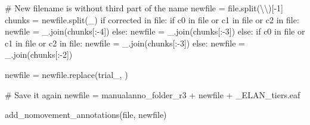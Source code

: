 \documentclass[
  letterpaper,
  DIV=11,
  numbers=noendperiod]{scrreprt}
\newenvironment{Shaded}{\begin{snugshade}}{\end{snugshade}}
\newcommand{\BuiltInTok}[1]{\textcolor[rgb]{0.00,0.23,0.31}{#1}}
\newcommand{\CharTok}[1]{\textcolor[rgb]{0.13,0.47,0.30}{#1}}
\newcommand{\CommentTok}[1]{\textcolor[rgb]{0.37,0.37,0.37}{#1}}
\newcommand{\ControlFlowTok}[1]{\textcolor[rgb]{0.00,0.23,0.31}{#1}}
\newcommand{\DecValTok}[1]{\textcolor[rgb]{0.68,0.00,0.00}{#1}}
\newcommand{\KeywordTok}[1]{\textcolor[rgb]{0.00,0.23,0.31}{#1}}
\newcommand{\NormalTok}[1]{\textcolor[rgb]{0.00,0.23,0.31}{#1}}
\newcommand{\OperatorTok}[1]{\textcolor[rgb]{0.37,0.37,0.37}{#1}}
\newcommand{\StringTok}[1]{\textcolor[rgb]{0.13,0.47,0.30}{#1}}
\begin{document}
\begin{Shaded}
\begin{Highlighting}[]
    \CommentTok{\# New filename is without third part of the name}
\NormalTok{    newfile }\OperatorTok{=} \BuiltInTok{file}\NormalTok{.split(}\StringTok{\textquotesingle{}}\CharTok{\textbackslash{}\textbackslash{}}\StringTok{\textquotesingle{}}\NormalTok{)[}\OperatorTok{{-}}\DecValTok{1}\NormalTok{]}
\NormalTok{    chunks }\OperatorTok{=}\NormalTok{ newfile.split(}\StringTok{\textquotesingle{}\_\textquotesingle{}}\NormalTok{)}
    \ControlFlowTok{if} \StringTok{\textquotesingle{}corrected\textquotesingle{}} \KeywordTok{in} \BuiltInTok{file}\NormalTok{:}
        \ControlFlowTok{if} \StringTok{\textquotesingle{}c0\textquotesingle{}} \KeywordTok{in} \BuiltInTok{file} \KeywordTok{or} \StringTok{\textquotesingle{}c1\textquotesingle{}} \KeywordTok{in} \BuiltInTok{file} \KeywordTok{or} \StringTok{\textquotesingle{}c2\textquotesingle{}} \KeywordTok{in} \BuiltInTok{file}\NormalTok{:}
\NormalTok{            newfile }\OperatorTok{=} \StringTok{\textquotesingle{}\_\textquotesingle{}}\NormalTok{.join(chunks[:}\OperatorTok{{-}}\DecValTok{4}\NormalTok{])}
        \ControlFlowTok{else}\NormalTok{:}
\NormalTok{            newfile }\OperatorTok{=} \StringTok{\textquotesingle{}\_\textquotesingle{}}\NormalTok{.join(chunks[:}\OperatorTok{{-}}\DecValTok{3}\NormalTok{])}
    \ControlFlowTok{else}\NormalTok{:}
        \ControlFlowTok{if} \StringTok{\textquotesingle{}c0\textquotesingle{}} \KeywordTok{in} \BuiltInTok{file} \KeywordTok{or} \StringTok{\textquotesingle{}c1\textquotesingle{}} \KeywordTok{in} \BuiltInTok{file} \KeywordTok{or} \StringTok{\textquotesingle{}c2\textquotesingle{}} \KeywordTok{in} \BuiltInTok{file}\NormalTok{:}
\NormalTok{            newfile }\OperatorTok{=} \StringTok{\textquotesingle{}\_\textquotesingle{}}\NormalTok{.join(chunks[:}\OperatorTok{{-}}\DecValTok{3}\NormalTok{])}
        \ControlFlowTok{else}\NormalTok{:}
\NormalTok{            newfile }\OperatorTok{=} \StringTok{\textquotesingle{}\_\textquotesingle{}}\NormalTok{.join(chunks[:}\OperatorTok{{-}}\DecValTok{2}\NormalTok{]) }

\NormalTok{    newfile }\OperatorTok{=}\NormalTok{ newfile.replace(}\StringTok{\textquotesingle{}trial\_\textquotesingle{}}\NormalTok{, }\StringTok{\textquotesingle{}\textquotesingle{}}\NormalTok{)}
    
    \CommentTok{\# Save it again}
\NormalTok{    newfile }\OperatorTok{=}\NormalTok{ manualanno\_folder\_r3 }\OperatorTok{+}\NormalTok{ newfile }\OperatorTok{+} \StringTok{\textquotesingle{}\_ELAN\_tiers.eaf\textquotesingle{}}

\NormalTok{    add\_nomovement\_annotations(}\BuiltInTok{file}\NormalTok{, newfile)}
\end{Highlighting}
\end{Shaded}
\end{document}
